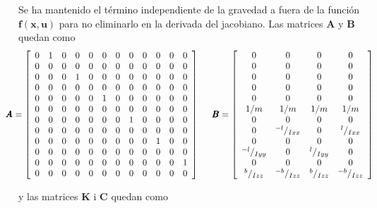 \documentclass[twoside]{article}
\begin{document}
Se ha mantenido el término independiente de la gravedad a fuera de la función $\pmb{f(x,u)}$ para no eliminarlo en la derivada del jacobiano. Las matrices $\pmb{A}$ y $\pmb{B}$ quedan como
\begin{equation}
\hspace*{-0.5cm}\pmb{A}=\left[ \begin{array}{cccccccccccc}
0 & 1 & 0 & 0 & 0 & 0 & 0 & 0 & 0 & 0 & 0 & 0 \\
0 & 0 & 0 & 0 & 0 & 0 & 0 & 0 & 0 & 0 & 0 & 0 \\
0 & 0 & 0 & 1 & 0 & 0 & 0 & 0 & 0 & 0 & 0 & 0 \\
0 & 0 & 0 & 0 & 0 & 0 & 0 & 0 & 0 & 0 & 0 & 0 \\
0 & 0 & 0 & 0 & 0 & 1 & 0 & 0 & 0 & 0 & 0 & 0 \\
0 & 0 & 0 & 0 & 0 & 0 & 0 & 0 & 0 & 0 & 0 & 0 \\
0 & 0 & 0 & 0 & 0 & 0 & 0 & 1 & 0 & 0 & 0 & 0 \\
0 & 0 & 0 & 0 & 0 & 0 & 0 & 0 & 0 & 0 & 0 & 0 \\
0 & 0 & 0 & 0 & 0 & 0 & 0 & 0 & 0 & 1 & 0 & 0 \\
0 & 0 & 0 & 0 & 0 & 0 & 0 & 0 & 0 & 0 & 0 & 0 \\
0 & 0 & 0 & 0 & 0 & 0 & 0 & 0 & 0 & 0 & 0 & 1 \\
0 & 0 & 0 & 0 & 0 & 0 & 0 & 0 & 0 & 0 & 0 & 0 \\ \end{array} \right] \hspace*{0.5cm} \pmb{B} = \left[ \begin{array}{cccc}
0 & 0 & 0 & 0 \\
0 & 0 & 0 & 0 \\
0 & 0 & 0 & 0 \\
0 & 0 & 0 & 0 \\
0 & 0 & 0 & 0 \\
1/m & 1/m & 1/m & 1/m \\ 
0 & 0 & 0 & 0 \\
0 & {}^{-l}/_{Ixx} & 0 & {}^{l}/_{Ixx} \\ 
0 & 0 & 0 & 0 \\
{}^{-l}/_{Iyy} & 0 & {}^{l}/_{Iyy} & 0 \\
0 & 0 & 0 & 0 \\
{}^{b}/_{Izz} & {}^{-b}/_{Izz} & {}^{b}/_{Izz} & {}^{-b}/_{Izz} \\ \end{array} \right]
\end{equation}

y las matrices $\pmb{K}$ i $\pmb{C}$ quedan como 
\end{document}
